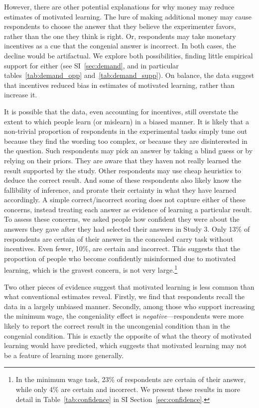 \documentclass[12pt, letterpaper]{article}
\begin{document}
However, there are other potential explanations for why money may reduce estimates of motivated learning. The lure of making additional money may cause respondents to choose the answer that they believe the experimenter favors, rather than the one they think is right. Or, respondents may take monetary incentives as a cue that the congenial answer is incorrect. In both cases, the decline would be artifactual. We explore both possibilities, finding little empirical support for either (see SI~\ref{sec:demand}, and in particular tables~\ref{tab:demand_opp} and~\ref{tab:demand_supp}). On balance, the data suggest that incentives reduced bias in estimates of motivated learning, rather than increase it.

It is possible that the data, even accounting for incentives, still overstate the extent to which people learn (or mislearn) in a biased manner. It is likely that a non-trivial proportion of respondents in the experimental tasks simply tune out because they find the wording too complex, or because they are disinterested in the question. Such respondents may pick an answer by taking a blind guess or by relying on their priors. They are aware that they haven not really learned the result supported by the study. Other respondents may use cheap heuristics to deduce the correct result. And some of these respondents also likely know the fallibility of inference, and prorate their certainty in what they have learned accordingly. A simple correct/incorrect scoring does not capture either of these concerns, instead treating each answer as evidence of learning a particular result. To assess these concerns, we asked people how confident they were about the answers they gave after they had selected their answers in Study 3. Only 13\% of respondents are certain of their answer in the concealed carry task without incentives. Even fewer, 10\%, are certain and incorrect. This suggests that the proportion of people who become confidently misinformed due to motivated learning, which is the gravest concern, is not very large.\footnote{In the minimum wage task, 23\% of respondents are certain of their answer, while only 4\% are certain and incorrect. We present these results in more detail in Table~\ref{tab:confidence} in SI Section~\ref{sec:confidence}.}

Two other pieces of evidence suggest that motivated learning is less common than what conventional estimates reveal. Firstly, we find that respondents recall the data in a largely unbiased manner. Secondly, among those who support increasing the minimum wage, the congeniality effect is \textit{negative}---respondents were more likely to report the correct result in the uncongenial condition than in the congenial condition. This is exactly the opposite of what the theory of motivated learning would have predicted, which suggests that motivated learning may not be a feature of learning more generally.
\end{document}
